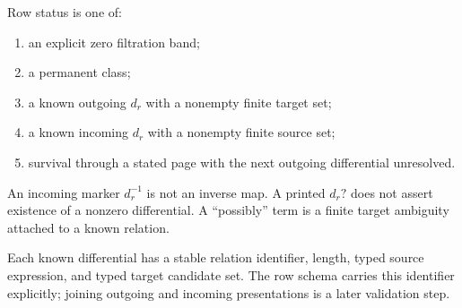 \begin{definition}
  \label{def:appendix-row-status}
  \leanok
  Row status is one of:
  \begin{enumerate}
    \item an explicit zero filtration band;
    \item a permanent class;
    \item a known outgoing $d_r$ with a nonempty finite target set;
    \item a known incoming $d_r$ with a nonempty finite source set;
    \item survival through a stated page with the next outgoing differential
      unresolved.
  \end{enumerate}
  An incoming marker $d_r^{-1}$ is not an inverse map.  A printed $d_r?$ does
  not assert existence of a nonzero differential.  A ``possibly'' term is a
  finite target ambiguity attached to a known relation.
\end{definition}

\begin{definition}
  \label{def:differential-relation-id}
  \leanok
  Each known differential has a stable relation identifier, length, typed
  source expression, and typed target candidate set.  The row schema carries
  this identifier explicitly; joining outgoing and incoming presentations is
  a later validation step.
\end{definition}

